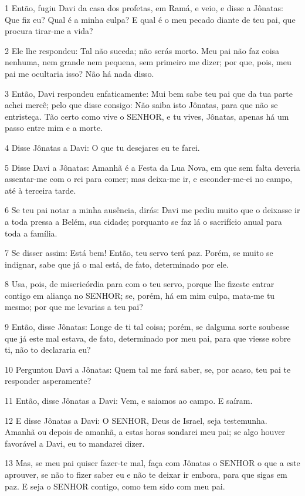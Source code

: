 \par 1 Então, fugiu Davi da casa dos profetas, em Ramá, e veio, e disse a Jônatas: Que fiz eu? Qual é a minha culpa? E qual é o meu pecado diante de teu pai, que procura tirar-me a vida?
\par 2 Ele lhe respondeu: Tal não suceda; não serás morto. Meu pai não faz coisa nenhuma, nem grande nem pequena, sem primeiro me dizer; por que, pois, meu pai me ocultaria isso? Não há nada disso.
\par 3 Então, Davi respondeu enfaticamente: Mui bem sabe teu pai que da tua parte achei mercê; pelo que disse consigo: Não saiba isto Jônatas, para que não se entristeça. Tão certo como vive o SENHOR, e tu vives, Jônatas, apenas há um passo entre mim e a morte.
\par 4 Disse Jônatas a Davi: O que tu desejares eu te farei.
\par 5 Disse Davi a Jônatas: Amanhã é a Festa da Lua Nova, em que sem falta deveria assentar-me com o rei para comer; mas deixa-me ir, e esconder-me-ei no campo, até à terceira tarde.
\par 6 Se teu pai notar a minha ausência, dirás: Davi me pediu muito que o deixasse ir a toda pressa a Belém, sua cidade; porquanto se faz lá o sacrifício anual para toda a família.
\par 7 Se disser assim: Está bem! Então, teu servo terá paz. Porém, se muito se indignar, sabe que já o mal está, de fato, determinado por ele.
\par 8 Usa, pois, de misericórdia para com o teu servo, porque lhe fizeste entrar contigo em aliança no SENHOR; se, porém, há em mim culpa, mata-me tu mesmo; por que me levarias a teu pai?
\par 9 Então, disse Jônatas: Longe de ti tal coisa; porém, se dalguma sorte soubesse que já este mal estava, de fato, determinado por meu pai, para que viesse sobre ti, não to declararia eu?
\par 10 Perguntou Davi a Jônatas: Quem tal me fará saber, se, por acaso, teu pai te responder asperamente?
\par 11 Então, disse Jônatas a Davi: Vem, e saiamos ao campo. E saíram.
\par 12 E disse Jônatas a Davi: O SENHOR, Deus de Israel, seja testemunha. Amanhã ou depois de amanhã, a estas horas sondarei meu pai; se algo houver favorável a Davi, eu to mandarei dizer.
\par 13 Mas, se meu pai quiser fazer-te mal, faça com Jônatas o SENHOR o que a este aprouver, se não to fizer saber eu e não te deixar ir embora, para que sigas em paz. E seja o SENHOR contigo, como tem sido com meu pai.
